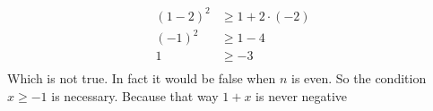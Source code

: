 \documentclass{article}
\begin{document}
\begin{align*}
   (1 - 2)^2 &\geq 1 + 2 \cdot (-2) \\
   (-1)^2    &\geq 1 - 4            \\
   1         &\geq -3               \\
\end{align*}
Which is not true. In fact it would be false when \(n\) is even. So the condition \(x \geq -1\) is necessary. Because that way \(1 + x\) is never negative
\end{document}
